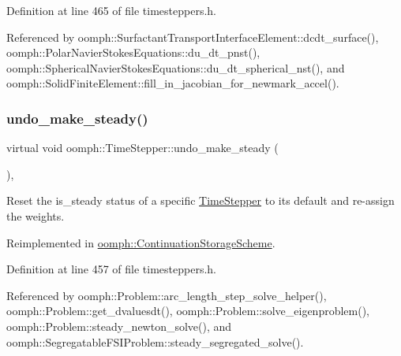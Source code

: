 Definition at line 465 of file timesteppers.\+h.



Referenced by oomph\+::\+Surfactant\+Transport\+Interface\+Element\+::dcdt\+\_\+surface(), oomph\+::\+Polar\+Navier\+Stokes\+Equations\+::du\+\_\+dt\+\_\+pnst(), oomph\+::\+Spherical\+Navier\+Stokes\+Equations\+::du\+\_\+dt\+\_\+spherical\+\_\+nst(), and oomph\+::\+Solid\+Finite\+Element\+::fill\+\_\+in\+\_\+jacobian\+\_\+for\+\_\+newmark\+\_\+accel().

\mbox{\label{classoomph_1_1TimeStepper_aada05f89e86aae352bd5b32bfb173b18}} 
\subsubsection{\texorpdfstring{undo\+\_\+make\+\_\+steady()}{undo\_make\_steady()}}
{\footnotesize\ttfamily virtual void oomph\+::\+Time\+Stepper\+::undo\+\_\+make\+\_\+steady (\begin{DoxyParamCaption}{ }\end{DoxyParamCaption})\hspace{0.3cm}{\ttfamily [inline]}, {\ttfamily [virtual]}}



Reset the is\+\_\+steady status of a specific \hyperlink{classoomph_1_1TimeStepper}{Time\+Stepper} to its default and re-\/assign the weights. 



Reimplemented in \hyperlink{classoomph_1_1ContinuationStorageScheme_adf4be6b7cf66d8b8f4dfed7520d43afb}{oomph\+::\+Continuation\+Storage\+Scheme}.



Definition at line 457 of file timesteppers.\+h.



Referenced by oomph\+::\+Problem\+::arc\+\_\+length\+\_\+step\+\_\+solve\+\_\+helper(), oomph\+::\+Problem\+::get\+\_\+dvaluesdt(), oomph\+::\+Problem\+::solve\+\_\+eigenproblem(), oomph\+::\+Problem\+::steady\+\_\+newton\+\_\+solve(), and oomph\+::\+Segregatable\+F\+S\+I\+Problem\+::steady\+\_\+segregated\+\_\+solve().

\mbox{\label{classoomph_1_1TimeStepper_ab9813c8ea8ad981f0db9a467302b9cd0}} 
